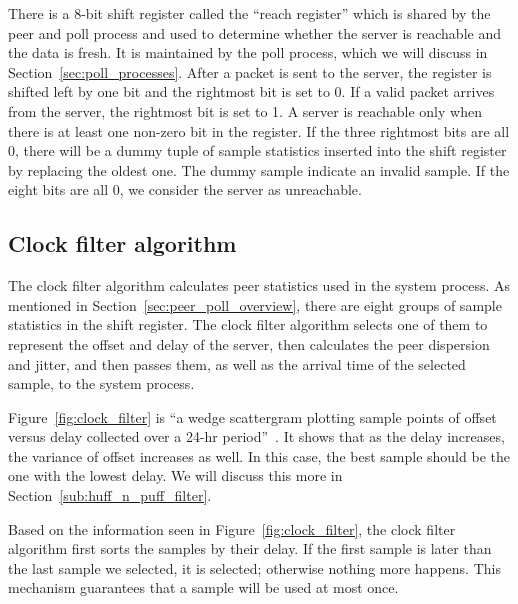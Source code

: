 There is a 8-bit shift register called the ``reach register'' which is
shared by the peer
and poll process and used to determine whether the server is reachable and the
data is fresh. It is maintained by the poll process, which we will discuss in
Section~\ref{sec:poll_processes}. After a packet is sent to the server, the
register is shifted left by one bit and the rightmost bit is set to 0. If a
valid packet arrives from the server, the rightmost bit is set to 1. A
server is reachable only when there is at least one non-zero bit in the
register. If the three rightmost bits are all 0, there will be a dummy tuple of
sample statistics
inserted into the shift register by replacing the oldest one. The dummy sample
indicate an invalid sample. If the eight bits are all 0, we consider the
server as unreachable.

\subsection{Clock filter algorithm}%
\label{sub:clock_filter_algorithm}
The clock filter algorithm calculates peer statistics used in the system
process.  As mentioned in Section~\ref{sec:peer_poll_overview}, there are eight
groups of sample statistics in the shift register. The clock filter algorithm
selects one of them to represent the offset and delay of the server, then
calculates the peer dispersion and jitter, and then passes them, as well as the
arrival time of the selected sample, to the system process.

Figure~\ref{fig:clock_filter} is ``a wedge scattergram plotting sample points
of offset versus delay collected over a 24-hr period''~\cite{clock_filter}. It
shows that as the delay increases, the variance of offset increases as
well. In this case, the best sample should be the one with the lowest delay. We
will discuss this more in Section~\ref{sub:huff_n_puff_filter}.



Based on the information seen in Figure~\ref{fig:clock_filter}, the clock filter
algorithm first sorts the samples by their delay. If the first sample is later
than the last sample we selected, it is selected; otherwise nothing more
happens. This mechanism guarantees that a sample will be used at most
once.

